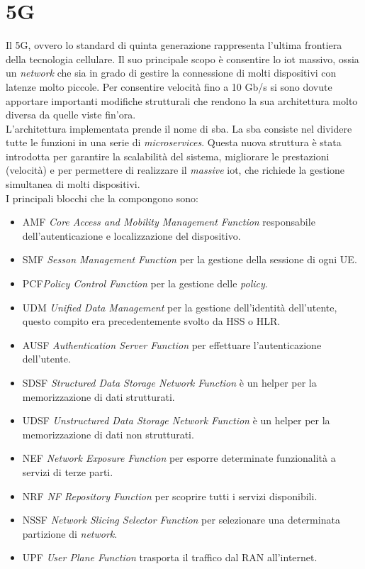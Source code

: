 \section{5G}
Il 5G, ovvero lo standard di quinta generazione rappresenta l'ultima frontiera della tecnologia cellulare.
Il suo principale scopo è consentire lo \gls{iot} massivo, ossia un \textit{network} che sia 
in grado di gestire la connessione di molti dispositivi con latenze molto piccole.
Per consentire velocità fino a 10 Gb/s si sono
dovute apportare importanti modifiche strutturali che rendono la sua architettura molto diversa da quelle viste fin'ora.\\
L'architettura implementata prende il nome di \gls{sba}.
La \gls{sba} consiste nel dividere tutte le funzioni in una serie di \textit{microservices}\cite{5g-approach}. 
Questa nuova struttura è stata introdotta per garantire la scalabilità del sistema, migliorare le prestazioni (velocità) e per 
permettere di realizzare il \textit{massive} \gls{iot}, che richiede la gestione simultanea di molti dispositivi.\\
I principali blocchi che la compongono sono:
\begin{itemize}
    \item AMF \textit{Core Access and Mobility Management Function} responsabile dell'autenticazione e localizzazione del dispositivo.
    \item SMF \textit{Sesson Management Function} per la gestione della sessione di ogni UE.
    \item PCF\textit{Policy Control Function} per la gestione delle \textit{policy}.
    \item UDM \textit{Unified Data Management} per la gestione dell'identità dell'utente, questo compito era precedentemente svolto da HSS o HLR.
    \item AUSF \textit{Authentication Server Function} per effettuare l'autenticazione dell'utente.
    \item SDSF \textit{Structured Data Storage Network Function} è un helper per la memorizzazione di dati strutturati.
    \item UDSF \textit{Unstructured Data Storage Network Function} è un helper per la memorizzazione di dati non strutturati.
    \item NEF \textit{Network Exposure Function} per esporre determinate funzionalità a servizi di terze parti.
    \item NRF \textit{NF Repository Function} per scoprire tutti i servizi disponibili.
    \item NSSF \textit{Network Slicing Selector Function} per selezionare una determinata partizione di \textit{network}.
    \item UPF \textit{User Plane Function} trasporta il traffico dal RAN all'internet.
\end{itemize}
